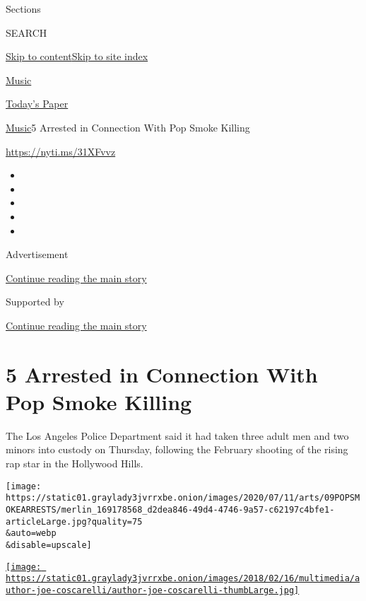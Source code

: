 Sections

SEARCH

\protect\hyperlink{site-content}{Skip to
content}\protect\hyperlink{site-index}{Skip to site index}

\href{https://www.nytimes3xbfgragh.onion/section/arts/music}{Music}

\href{https://myaccount.nytimes3xbfgragh.onion/auth/login?response_type=cookie\&client_id=vi}{}

\href{https://www.nytimes3xbfgragh.onion/section/todayspaper}{Today's
Paper}

\href{/section/arts/music}{Music}\textbar{}5 Arrested in Connection With
Pop Smoke Killing

\url{https://nyti.ms/31XFvvz}

\begin{itemize}
\item
\item
\item
\item
\item
\end{itemize}

Advertisement

\protect\hyperlink{after-top}{Continue reading the main story}

Supported by

\protect\hyperlink{after-sponsor}{Continue reading the main story}

\hypertarget{5-arrested-in-connection-with-pop-smoke-killing}{%
\section{5 Arrested in Connection With Pop Smoke
Killing}\label{5-arrested-in-connection-with-pop-smoke-killing}}

The Los Angeles Police Department said it had taken three adult men and
two minors into custody on Thursday, following the February shooting of
the rising rap star in the Hollywood Hills.

\texttt{[image: https://static01.graylady3jvrrxbe.onion/images/2020/07/11/arts/09POPSMOKEARRESTS/merlin\_169178568\_d2dea846-49d4-4746-9a57-c62197c4bfe1-articleLarge.jpg?quality=75\\\&auto=webp\\\&disable=upscale]}

\href{https://www.nytimes3xbfgragh.onion/by/joe-coscarelli}{\texttt{[image: https://static01.graylady3jvrrxbe.onion/images/2018/02/16/multimedia/author-joe-coscarelli/author-joe-coscarelli-thumbLarge.jpg]}}

